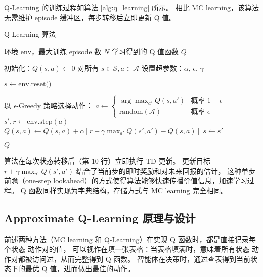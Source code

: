Q-Learning 的训练过程如算法 \ref{alg:q_learning} 所示。
相比 MC learning，该算法无需维护 episode 缓冲区，每步转移后立即更新 Q 值。

\begin{algorithm}[h]
    \caption{Q-Learning 算法}
    \small
    \label{alg:q_learning}
    \begin{algorithmic}[1]
        \Require 环境 $\text{env}$，最大训练 episode 数 $N$
        \Ensure 学习得到的 Q 值函数 $Q$
        
        \State 初始化：$Q(s,a) \leftarrow 0$ 对所有 $s \in \mathcal{S}, a \in \mathcal{A}$
        \State 设置超参数：$\alpha$, $\epsilon$, $\gamma$
        
            \State $s \leftarrow \text{env.reset()}$
            
                \State 以 $\epsilon$-Greedy 策略选择动作：
                \State \quad $a \leftarrow \begin{cases} 
                    \arg\max_{a'} Q(s, a') & \text{概率 } 1-\epsilon \\
                    \text{random}(\mathcal{A}) & \text{概率 } \epsilon
                \end{cases}$
                \State $s', r \leftarrow \text{env.step}(a)$
                \State $Q(s, a) \leftarrow Q(s, a) + \alpha \left[ r + \gamma \max_{a'} Q(s', a') - Q(s, a) \right]$ 
                \State $s \leftarrow s'$
            \EndWhile
        \EndFor
        
        \Return $Q$
    \end{algorithmic}
\end{algorithm}

算法在每次状态转移后（第 10 行）立即执行 TD 更新。
更新目标 $r + \gamma \max_{a'} Q(s', a')$ 结合了当前步的即时奖励和对未来回报的估计，
这种单步前瞻（one-step lookahead）的方式使得算法能够快速传播价值信息，加速学习过程。
Q 函数同样实现为字典结构，存储方式与 MC learning 完全相同。


\subsection{Approximate Q-Learning 原理与设计}

前述两种方法（MC learning 和 Q-Learning）在实现 Q 函数时，都是直接记录每个状态-动作对的值，
可以视作在填一张表格：当表格填满时，意味着所有状态-动作对都被访问过，从而完整得到 Q 函数。
智能体在决策时，通过查表得到当前状态下的最优 Q 值，进而做出最佳的动作。

